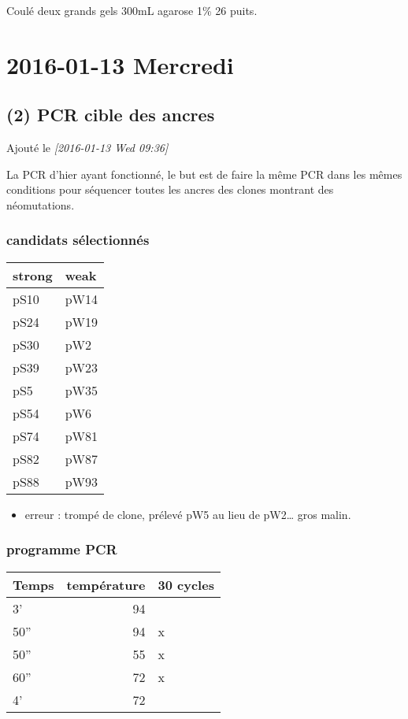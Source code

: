 \documentclass[9pt, oneside, twocolumn]{scrartcl}
\begin{document}
Coulé deux grands gels 300mL agarose 1\% 26 puits.
\section{2016-01-13 Mercredi}
\label{sec:orgheadline29}
\subsection{(2) PCR cible des ancres}
\label{sec:orgheadline23}
Ajouté le \textit{[2016-01-13 Wed 09:36]}

La PCR d'hier ayant fonctionné, le but est de faire la même PCR dans les mêmes
conditions pour séquencer toutes les ancres des clones montrant des
néomutations. 

\subsubsection{candidats sélectionnés}
\label{sec:orgheadline19}
\begin{center}
\begin{tabular}{ll}
\toprule
strong & weak\\
\midrule
pS10 & pW14\\
pS24 & pW19\\
pS30 & pW2\\
pS39 & pW23\\
pS5 & pW35\\
pS54 & pW6\\
pS74 & pW81\\
pS82 & pW87\\
pS88 & pW93\\
\bottomrule
\end{tabular}
\end{center}

\begin{itemize}
\item erreur : trompé de clone, prélevé pW5 au lieu de pW2… gros malin.
\end{itemize}

\subsubsection{programme PCR}
\label{sec:orgheadline20}
\begin{center}
\begin{tabular}{lrl}
\toprule
Temps & température & 30 cycles\\
\midrule
3' & 94 & \\
50'' & 94 & x\\
50'' & 55 & x\\
60'' & 72 & x\\
4' & 72 & \\
\bottomrule
\end{tabular}
\end{center}
\end{document}
